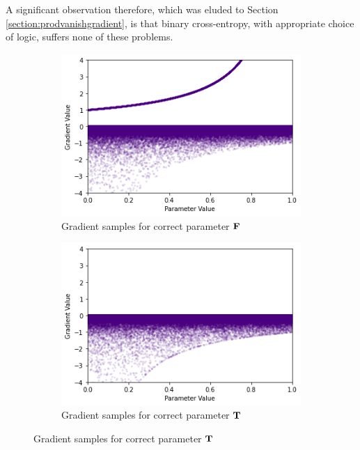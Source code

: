 A significant observation therefore, which was eluded to Section \ref{section:prodvanishgradient}, is that binary cross-entropy, with appropriate choice of logic, suffers none of these problems. 


\begin{figure}[H]
    \centering
    \begin{subfigure}[b]{0.47\textwidth}
        \centering
        \includegraphics[width=\textwidth]{imgs/grad_prod_bce_falseparam_10dim.png}
        \caption{Gradient samples for correct parameter $\textbf{F}$}
        \label{fig:conjgrad1falsebce}
    \end{subfigure}
    \begin{subfigure}[b]{0.47\textwidth}
        \centering
        \includegraphics[width=\textwidth]{imgs/grad_prod_bce_trueparam_10dim.png}
        \caption{Gradient samples for correct parameter $\textbf{T}$}

\end{subfigure}
\end{figure}
